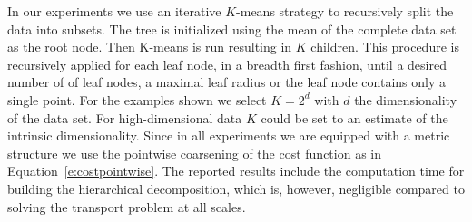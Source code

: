 \documentclass[twoside,11pt]{article}
\begin{document}
In our experiments we use an iterative $K$-means strategy to recursively split
the data into subsets. The tree is initialized using the mean of the complete
data set as the root node.  Then K-means is run resulting in $K$ children. This
procedure is recursively applied for each leaf node, in a breadth first
fashion, until a desired number of of leaf nodes, a maximal leaf radius or the
leaf node contains only a single point. For the examples shown we select $K =
2^d$ with $d$ the dimensionality of the data set. For high-dimensional data $K$
could be set to an estimate of the intrinsic dimensionality. Since in all
experiments we are equipped with a metric structure we use the pointwise
coarsening of the cost function as in Equation~\eqref{e:costpointwise}. The
reported results include the computation time for building the hierarchical
decomposition, which is, however, negligible compared to solving the transport
problem at all scales.
\end{document}
